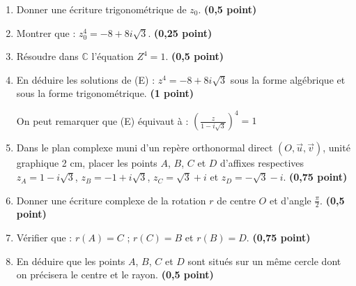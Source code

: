 \documentclass[12pt,a4paper]{article}
\begin{document}
\begin{enumerate}
    \item Donner une écriture trigonométrique de $z_0$. \hfill \textbf{(0,5 point)}
    \item Montrer que : $z_0^4 = -8 + 8i\sqrt{3}$. \hfill \textbf{(0,25 point)}
    \item Résoudre dans $\mathbb{C}$ l’équation $Z^4 = 1$. \hfill \textbf{(0,5 point)}
    \item En déduire les solutions de (E) : $z^4 = -8 + 8i\sqrt{3}$ sous la forme algébrique et sous la forme trigonométrique. \hfill \textbf{(1 point)}
    
    \medskip
    On peut remarquer que (E) équivaut à :
$\left( \frac{z}{1 - i\sqrt{3}} \right)^4 = 1$
    \item Dans le plan complexe muni d’un repère orthonormal direct $(O, \vec{u}, \vec{v})$, unité graphique 2 cm, placer les points $A$, $B$, $C$ et $D$ d’affixes respectives $z_A = 1 - i\sqrt{3}$, $z_B = -1 + i\sqrt{3}$, $z_C = \sqrt{3} + i$ et $z_D = -\sqrt{3} - i$. \hfill \textbf{(0,75 point)}
    
    \item Donner une écriture complexe de la rotation $r$ de centre $O$ et d’angle $\frac{\pi}{2}$. \hfill \textbf{(0,5 point)}
    
    \item Vérifier que : $r(A) = C$ ; $r(C) = B$ et $r(B) = D$. \hfill \textbf{(0,75 point)}
    
    \item En déduire que les points $A$, $B$, $C$ et $D$ sont situés sur un même cercle dont on précisera le centre et le rayon. \hfill \textbf{(0,5 point)}
\end{enumerate}
\end{document}
